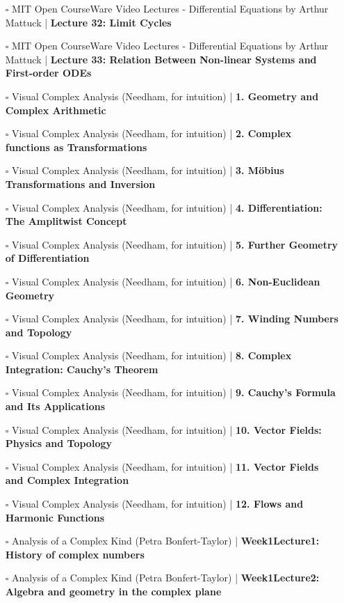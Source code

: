 \documentclass[a4, landscape, 12pt]{article}
\newcommand{\checkbox}{$\square$}%
\begin{document}
\begin{itemize}
{}
\item [\checkbox] MIT Open CourseWare Video Lectures - Differential Equations by Arthur Mattuck  | \textbf{Lecture 32: Limit Cycles
}
\item [\checkbox] MIT Open CourseWare Video Lectures - Differential Equations by Arthur Mattuck  | \textbf{Lecture 33: Relation Between Non-linear Systems and First-order ODEs
}
\item [\checkbox] Visual Complex Analysis (Needham, for intuition)  | \textbf{1. Geometry and Complex Arithmetic
}
\item [\checkbox] Visual Complex Analysis (Needham, for intuition)  | \textbf{2. Complex functions as Transformations
}
\item [\checkbox] Visual Complex Analysis (Needham, for intuition)  | \textbf{3. Möbius Transformations and Inversion
}
\item [\checkbox] Visual Complex Analysis (Needham, for intuition)  | \textbf{4. Differentiation: The Amplitwist Concept
}
\item [\checkbox] Visual Complex Analysis (Needham, for intuition)  | \textbf{5. Further Geometry of Differentiation
}
\item [\checkbox] Visual Complex Analysis (Needham, for intuition)  | \textbf{6. Non-Euclidean Geometry
}
\item [\checkbox] Visual Complex Analysis (Needham, for intuition)  | \textbf{7. Winding Numbers and Topology
}
\item [\checkbox] Visual Complex Analysis (Needham, for intuition)  | \textbf{8. Complex Integration: Cauchy's Theorem
}
\item [\checkbox] Visual Complex Analysis (Needham, for intuition)  | \textbf{9. Cauchy's Formula and Its Applications
}
\item [\checkbox] Visual Complex Analysis (Needham, for intuition)  | \textbf{10. Vector Fields: Physics and Topology
}
\item [\checkbox] Visual Complex Analysis (Needham, for intuition)  | \textbf{11. Vector Fields and Complex Integration
}
\item [\checkbox] Visual Complex Analysis (Needham, for intuition)  | \textbf{12. Flows and Harmonic Functions
}
\item [\checkbox] Analysis of a Complex Kind (Petra Bonfert-Taylor)  | \textbf{Week1Lecture1: History of complex numbers
}
\item [\checkbox] Analysis of a Complex Kind (Petra Bonfert-Taylor)  | \textbf{Week1Lecture2: Algebra and geometry in the complex plane
}
\end{itemize}
\end{document}
